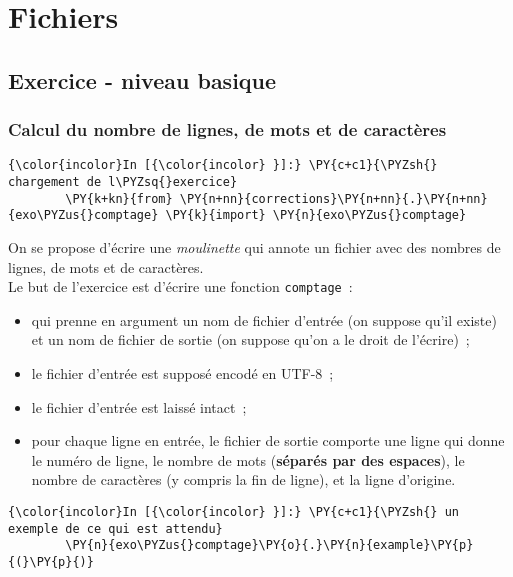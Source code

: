     \hypertarget{fichiers}{%
\section{Fichiers}\label{fichiers}}

    \hypertarget{exercice---niveau-basique}{%
\subsection{Exercice - niveau basique}\label{exercice---niveau-basique}}

    \hypertarget{calcul-du-nombre-de-lignes-de-mots-et-de-caractuxe8res}{%
\subsubsection{Calcul du nombre de lignes, de mots et de
caractères}\label{calcul-du-nombre-de-lignes-de-mots-et-de-caractuxe8res}}

    \begin{Verbatim}[commandchars=\\\{\}]
{\color{incolor}In [{\color{incolor} }]:} \PY{c+c1}{\PYZsh{} chargement de l\PYZsq{}exercice}
        \PY{k+kn}{from} \PY{n+nn}{corrections}\PY{n+nn}{.}\PY{n+nn}{exo\PYZus{}comptage} \PY{k}{import} \PY{n}{exo\PYZus{}comptage}
\end{Verbatim}


    On se propose d'écrire une \emph{moulinette} qui annote un fichier avec
des nombres de lignes, de mots et de caractères.\\

Le but de l'exercice est d'écrire une fonction \texttt{comptage}~:

\begin{itemize}
	\item 
	qui prenne en argument un nom de fichier d'entrée (on suppose qu'il existe)
	et un nom de fichier de sortie (on suppose qu'on a le droit de l'écrire)~;
	\item
	le fichier d'entrée est supposé encodé en UTF-8~;
	\item
	le fichier d'entrée est laissé intact~;
	\item
	pour chaque ligne en entrée, le
	fichier de sortie comporte une ligne qui donne le numéro de ligne, le
	nombre de mots (\textbf{séparés par des espaces}), le nombre de
	caractères (y compris la fin de ligne), et la ligne d'origine.
\end{itemize}

    \begin{Verbatim}[commandchars=\\\{\}]
{\color{incolor}In [{\color{incolor} }]:} \PY{c+c1}{\PYZsh{} un exemple de ce qui est attendu}
        \PY{n}{exo\PYZus{}comptage}\PY{o}{.}\PY{n}{example}\PY{p}{(}\PY{p}{)}
\end{Verbatim}


